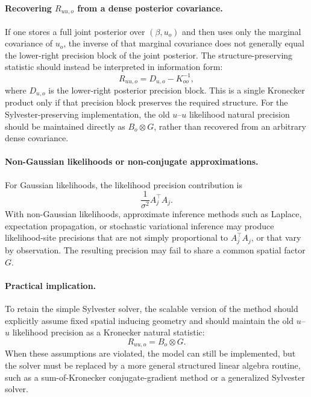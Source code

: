 \documentclass[12pt]{article}
\begin{document}
\paragraph{Recovering \(R_{uu,o}\) from a dense posterior covariance.}
If one stores a full joint posterior over \((\beta,u_o)\) and then uses only
the marginal covariance of \(u_o\), the inverse of that marginal covariance
does not generally equal the lower-right precision block of the joint
posterior. The structure-preserving statistic should instead be interpreted in
information form:
\begin{equation}
    R_{uu,o}=D_{u,o}-K_{oo}^{-1},
\end{equation}
where \(D_{u,o}\) is the lower-right posterior precision block. This is a
single Kronecker product only if that precision block preserves the required
structure. For the Sylvester-preserving implementation, the old $u$--$u$
likelihood natural precision should be maintained directly as \(B_o\otimes G\),
rather than recovered from an arbitrary dense covariance.

\paragraph{Non-Gaussian likelihoods or non-conjugate approximations.}
For Gaussian likelihoods, the likelihood precision contribution is
\begin{equation}
    \frac{1}{\sigma^2}A_j^\top A_j.
\end{equation}
With non-Gaussian likelihoods, approximate inference methods such as
Laplace, expectation propagation, or stochastic variational inference may
produce likelihood-site precisions that are not simply proportional to
\(A_j^\top A_j\), or that vary by observation. The resulting precision
may fail to share a common spatial factor \(G\).

\paragraph{Practical implication.}
To retain the simple Sylvester solver, the scalable version of the method
should explicitly assume fixed spatial inducing geometry and should
maintain the old $u$--$u$ likelihood precision as a Kronecker natural statistic:
\begin{equation}
    R_{uu,o}=B_o\otimes G.
\end{equation}
When these assumptions are violated, the model can still be implemented,
but the solver must be replaced by a more general structured linear
algebra routine, such as a sum-of-Kronecker conjugate-gradient method or a
generalized Sylvester solver.
\end{document}

